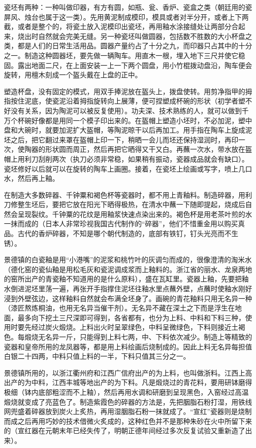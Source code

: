 \documentclass[12pt,UTF8]{ctexbook}
\begin{document}
瓷坯有两种：一种叫做印器，有方有圆，如瓶、瓮、香炉、瓷盒之类（朝廷用的瓷屏风、烛台也属于这一类）。先用黄泥制成模印，模具或者对半分开，或者上下两截，或者是整个的，将瓷土放入泥模印出瓷坯，再用釉水涂接缝处让两部分合起来，烧出时自然就会完美无缝。另一种瓷坯叫做圆器，包括数不胜数的大小杯盘之类，都是人们的日常生活用品。圆器产量约占了十分之九，而印器只占其中的十分之一。制造这种圆器坯，要先做一辆陶车。用直木一根，埋入地下三尺并使它稳固。露出地面二尺，在上面安装一上一下两个圆盘，用小竹棍拨动盘沿，陶车便会旋转，用檀木刻成一个盔头戴在上盘的正中。

塑造杯盘，没有固定的模式，用双手捧泥放在盔头上，拨盘使转。用剪净指甲的拇指按住泥底，使瓷泥沿着拇指旋转向上展薄，便可捏塑成杯碗的形状（初学者塑不好没有关系，因为陶泥可以被反复使用）。功夫深、技术熟练的人，就可以做到千万个杯碗好像都是用同一个模子印出来的。在盔帽上塑造小坯时，不必加泥，塑中盘和大碗时，就要加泥扩大盔帽，等陶泥晾干以后再加工。用手指在陶车上旋成泥坯之后，把它翻过来罩在盔帽上印一下，稍晒一会儿而坯还保持湿润时，再印一次，使陶器的形状圆而周正，然后再把它晒得又干又白。再蘸一次水，带水放在盔帽上用利刀刮削两次（执刀必须非常稳，如果稍有振动，瓷器成品就会有缺口）。瓷坯修好以后就可以在旋转的陶车上画圈。接着，在瓷坯上绘画或写字，喷上几口水，然后再上釉。

在制造大多数碎器、千钟粟和褐色杯等瓷器时，都不用上青釉料。制造碎器，用利刀修整生坯后，要把它放在阳光下晒得极热，在清水中蘸一下随即提起，烧成后自然会呈现裂纹。千钟粟的花纹是用釉浆快速点染出来的。褐色杯是用老茶叶煎的水一抹而成的（日本人非常珍视我国古代制作的“碎器”，他们不惜重金用以购买真品。古代的香炉碎器，不知是哪个朝代制造的，底部有铁钉，钉头光亮而不生锈）。

景德镇的白瓷釉是用“小港嘴”的泥浆和桃竹叶的灰调匀而成的，很像澄清的淘米水（德化窑的瓷仙釉是用松毛灰和瓷泥调成浆而上釉料的。浙江省的丽水、龙泉两地的窑所出产的青瓷釉不知道用的是什么原料），盛在瓦缸里。瓷器上釉，先要把釉水倒进泥坯里荡一遍，再张开手指撑住泥坯往釉水里点蘸外壁，点蘸时使釉水刚好浸到外壁弦边，这样釉料自然就会布满全坯身了。画碗的青花釉料只用无名异一种（漆匠熬炼桐油，也用无名异当催干剂）。无名异不藏在深土之下而是浮生在地面，最多向下挖土三尺深即可得到，各省都有，也分为上料、中料和下料三种，使用时要先经过炭火煅烧。上料出火时呈翠绿色，中料呈微绿色，下料则接近土褐色。每煅烧无名异一斤，只能得到上料七两，中、下料依次减少。制造上等精致的瓷器和皇帝所用的龙凤器等，都是用上料绘画后烧制成的。因此上料无名异每担值白银二十四两，中料只值上料的一半，下料只值其三分之一。

景德镇所用的，以浙江衢州府和江西广信府出产的为上料，也叫做浙料。江西上高出产的为中料，江西丰城等地出产的为下料。凡是煅烧过的青花料，要用研钵磨得极细（钵内底部粗涩而不上釉），然后再用水调和研磨到呈现黑色，入窑经过高温煅烧就变成了亮蓝色了。制造紫霞色的碎器的方法是，先把胭脂石粉打湿，用铁线网兜盛着碎器放到炭火上炙热，再用湿胭脂石粉一抹就成了。“宣红”瓷器则是烧制而成之后再用巧妙的技术借微火炙成的，这种红色并不是那种朱砂在火中所留下来的（宣红器在元朝末年已经失传了，明朝正德年间经过多次反复试验又重新造了出来）。
\end{document}
